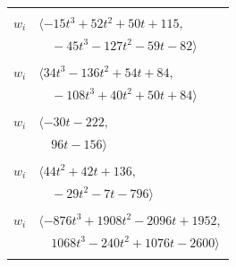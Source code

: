 \documentclass[11pt]{article}
\begin{document}
\begin{longtable}{@{}ll@{}}
\addlinespace[2pt]
\multicolumn{2}{@{}p{0.97\textwidth}@{}}{$i=85$, $D_i=1$, $\rho_{ij}$: $1{:}1, \allowbreak 3{:}1, \allowbreak 5{:}1, \allowbreak 19{:}2, \allowbreak 30{:}1, \allowbreak 31{:}1, \allowbreak 36{:}2, \allowbreak 42{:}2, \allowbreak 66{:}1, \allowbreak 74{:}2, \allowbreak 75{:}2, \allowbreak 79{:}2$}\\
$w_i$ & $\langle -15t^{3}+52t^{2}+50t+115,$\\
 & $\quad -45t^{3}-127t^{2}-59t-82\rangle$\\
\addlinespace[2pt]
\multicolumn{2}{@{}p{0.97\textwidth}@{}}{$i=86$, $D_i=1$, $\rho_{ij}$: $0{:}1, \allowbreak 1{:}1, \allowbreak 39{:}2, \allowbreak 55{:}1, \allowbreak 65{:}1, \allowbreak 68{:}2, \allowbreak 75{:}1, \allowbreak 96{:}2, \allowbreak 97{:}1$}\\
$w_i$ & $\langle 34t^{3}-136t^{2}+54t+84,$\\
 & $\quad -108t^{3}+40t^{2}+50t+84\rangle$\\
\addlinespace[2pt]
\multicolumn{2}{@{}p{0.97\textwidth}@{}}{$i=87$, $D_i=1$, $\rho_{ij}$: $30{:}2, \allowbreak 70{:}1$}\\
$w_i$ & $\langle -30t-222,$\\
 & $\quad 96t-156\rangle$\\
\addlinespace[2pt]
\multicolumn{2}{@{}p{0.97\textwidth}@{}}{$i=88$, $D_i=1$, $\rho_{ij}$: $26{:}2, \allowbreak 40{:}2, \allowbreak 52{:}2, \allowbreak 56{:}2, \allowbreak 65{:}1, \allowbreak 77{:}1, \allowbreak 82{:}2, \allowbreak 83{:}1, \allowbreak 91{:}1$}\\
$w_i$ & $\langle 44t^{2}+42t+136,$\\
 & $\quad -29t^{2}-7t-796\rangle$\\
\addlinespace[2pt]
\multicolumn{2}{@{}p{0.97\textwidth}@{}}{$i=89$, $D_i=1$, $\rho_{ij}$: $2{:}1, \allowbreak 17{:}2, \allowbreak 18{:}1, \allowbreak 19{:}2, \allowbreak 30{:}1, \allowbreak 34{:}1, \allowbreak 56{:}2, \allowbreak 60{:}1, \allowbreak 61{:}1, \allowbreak 68{:}2, \allowbreak 70{:}2, \allowbreak 71{:}1, \allowbreak 79{:}2, \allowbreak 80{:}2, \allowbreak 83{:}1, \allowbreak 84{:}2$}\\
$w_i$ & $\langle -876t^{3}+1908t^{2}-2096t+1952,$\\
 & $\quad 1068t^{3}-240t^{2}+1076t-2600\rangle$\\
\addlinespace[2pt]
\multicolumn{2}{@{}p{0.97\textwidth}@{}}{$i=90$, $D_i=1$, $\rho_{ij}$: $1{:}2, \allowbreak 37{:}2, \allowbreak 41{:}1, \allowbreak 50{:}1, \allowbreak 56{:}1, \allowbreak 65{:}2, \allowbreak 79{:}2, \allowbreak 81{:}1, \allowbreak 83{:}1, \allowbreak 84{:}2, \allowbreak 94{:}2$}\\

\end{longtable}
\end{document}
